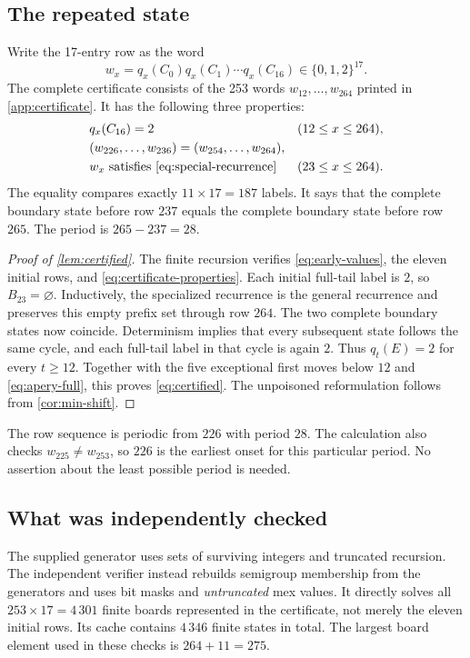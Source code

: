 \documentclass[11pt,letterpaper]{article}
\numberwithin{equation}{section}
\theoremstyle{definition}
\begin{document}
\subsection{The repeated state}

Write the 17-entry row as the word
\[
 w_x=q_x(C_0)q_x(C_1)\cdots q_x(C_{16})\in\{0,1,2\}^{17}.
\]
The complete certificate consists of the 253 words $w_{12},\ldots,w_{264}$
printed in \cref{app:certificate}. It has the following three properties:
\begin{equation}\label{eq:certificate-properties}
\begin{aligned}
 &q_x(C_{16})=2 &&(12\leq x\leq264),\\
 &(w_{226},\ldots,w_{236})=(w_{254},\ldots,w_{264}),\\
 &w_x\text{ satisfies \cref{eq:special-recurrence}} &&(23\leq x\leq264).
\end{aligned}
\end{equation}
The equality compares exactly $11\times17=187$ labels. It says that the
complete boundary state before row $237$ equals the complete boundary state
before row $265$. The period is $265-237=28$.

\begin{proof}[Proof of \cref{lem:certified}]
The finite recursion verifies \cref{eq:early-values}, the eleven initial
rows, and \cref{eq:certificate-properties}. Each initial full-tail label is
$2$, so $B_{23}=\varnothing$. Inductively, the specialized recurrence is the
general recurrence and preserves this empty prefix set through row $264$.
The two complete boundary states now coincide. Determinism implies that
every subsequent state follows the same cycle, and each full-tail label in
that cycle is again $2$. Thus $q_t(E)=2$ for every $t\geq12$.
Together with the five exceptional first moves below $12$ and
\cref{eq:apery-full}, this proves \cref{eq:certified}. The unpoisoned
reformulation follows from \cref{cor:min-shift}.
\end{proof}

The row sequence is periodic from $226$ with period $28$.
The calculation also checks $w_{225}\neq w_{253}$, so $226$ is the earliest
onset for this particular period. No assertion about the least possible
period is needed.

\subsection{What was independently checked}

The supplied generator uses sets of surviving integers and truncated
recursion. The independent verifier instead rebuilds semigroup membership
from the generators and uses bit masks and \emph{untruncated} mex values.
It directly solves all $253\times17=4\,301$ finite boards represented in the
certificate, not merely the eleven initial rows. Its cache contains $4\,346$
finite states in total. The largest board element used in these checks is
$264+11=275$.
\end{document}

